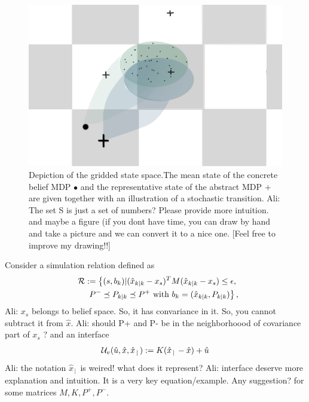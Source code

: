 \documentclass{ifacconf}
\newcommand{\red}[1]{{\color{red} #1}}
\renewcommand{\axx}[1]{{\color{orange} Ali: #1}}
\begin{document}
\begin{figure}[htp]
\centering
	\includegraphics[width = .8\columnwidth]{figs/grid}
	\caption{Depiction of the gridded state space.The mean state of the concrete belief MDP $\bullet$ and the  representative state of the abstract MDP $\boldsymbol{+}$ are given together with an illustration of a stochastic transition.  \axx{The set S is just a set of numbers? Please provide more intuition. and maybe a figure (if you dont have time, you can draw by hand and take a picture and we can convert it to a nice one.}\red{[Feel free to improve my drawing!!]}}\label{fig:grid}
\end{figure}

 
Consider a simulation relation defined as 
	\begin{align}\label{eq:rel}
\mathcal{R} := \left\{(s,b_k)| (\hat x_{k|k}-x_s)^T M(\hat x_{k|k}-x_s)\leq \epsilon, \right.\\\qquad\left.  P^-\preceq P_{k|k} \preceq   P^+ \mbox{ with } b_k=(\hat x_{k|k}, P_{k|k} ) \right\},\notag
	\end{align}
\axx{$x_s$ belongs to belief space. So, it has convariance in it. So, you cannot subtract it from $\hat{x}$.}
\axx{should P+ and P- be in the neighborhoood of covariance part of $x_s$ ?}
and an interface 
\[\mathcal{U}_{v}(\hat u, \hat x, \hat x_{\,|\,}):=K( \hat x_{\,|\,} -\hat x)+\hat u\]
\axx{the notation $\hat x_{\,|\,}$ is weired! what does it represent?}
\axx{interface deserve more explanation and intuition. It is a very key equation/example.}\red{Any suggestion?}
for some matrices $M, K,P^+,P^-$.
\end{document}
